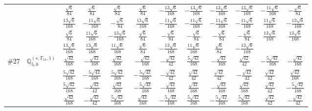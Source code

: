 \documentclass[fleqn,9pt,landscape]{jsarticle}
\begin{document}
\begin{center}
\begin{longtable}{lcccccccccc}
& $ \frac{\sqrt{6}}{84} $ & $ \frac{\sqrt{6}}{84} $ & $ \frac{\sqrt{6}}{84} $ & $ \frac{\sqrt{6}}{84} $ & $ - \frac{13 \sqrt{6}}{168} $ & $ - \frac{13 \sqrt{6}}{168} $ & $ - \frac{13 \sqrt{6}}{168} $ & $ - \frac{13 \sqrt{6}}{168} $ & $ - \frac{11 \sqrt{6}}{168} $ & $ - \frac{\sqrt{6}}{84} $ \\
& $ \frac{13 \sqrt{6}}{168} $ & $ - \frac{11 \sqrt{6}}{168} $ & $ - \frac{\sqrt{6}}{84} $ & $ \frac{13 \sqrt{6}}{168} $ & $ - \frac{11 \sqrt{6}}{168} $ & $ - \frac{11 \sqrt{6}}{168} $ & $ - \frac{11 \sqrt{6}}{168} $ & $ - \frac{11 \sqrt{6}}{168} $ & $ \frac{11 \sqrt{6}}{168} $ & $ - \frac{13 \sqrt{6}}{168} $ \\
& $ \frac{\sqrt{6}}{84} $ & $ \frac{11 \sqrt{6}}{168} $ & $ - \frac{13 \sqrt{6}}{168} $ & $ \frac{\sqrt{6}}{84} $ & $ - \frac{\sqrt{6}}{84} $ & $ - \frac{\sqrt{6}}{84} $ & $ - \frac{\sqrt{6}}{84} $ & $ - \frac{\sqrt{6}}{84} $ & $ \frac{13 \sqrt{6}}{168} $ & $ \frac{13 \sqrt{6}}{168} $ \\
& $ \frac{13 \sqrt{6}}{168} $ & $ \frac{13 \sqrt{6}}{168} $ & $ \frac{11 \sqrt{6}}{168} $ & $ \frac{\sqrt{6}}{84} $ & $ - \frac{13 \sqrt{6}}{168} $ & $ \frac{11 \sqrt{6}}{168} $ & $ \frac{\sqrt{6}}{84} $ & $ - \frac{13 \sqrt{6}}{168} $ & $  $ & $  $ \\ \hline
$ \#27\quad \mathbb{Q}_{5,0}^{(s,T_{1u},1)} $ & $ \frac{\sqrt{42}}{168} $ & $ - \frac{\sqrt{42}}{168} $ & $ \frac{\sqrt{42}}{168} $ & $ - \frac{\sqrt{42}}{168} $ & $ - \frac{\sqrt{42}}{42} $ & $ \frac{5 \sqrt{42}}{168} $ & $ - \frac{\sqrt{42}}{168} $ & $ \frac{\sqrt{42}}{42} $ & $ - \frac{5 \sqrt{42}}{168} $ & $ - \frac{\sqrt{42}}{168} $ \\
& $ \frac{5 \sqrt{42}}{168} $ & $ - \frac{5 \sqrt{42}}{168} $ & $ \frac{5 \sqrt{42}}{168} $ & $ - \frac{5 \sqrt{42}}{168} $ & $ - \frac{\sqrt{42}}{42} $ & $ \frac{\sqrt{42}}{42} $ & $ \frac{\sqrt{42}}{42} $ & $ - \frac{\sqrt{42}}{42} $ & $ \frac{\sqrt{42}}{42} $ & $ \frac{\sqrt{42}}{168} $ \\
& $ \frac{5 \sqrt{42}}{168} $ & $ - \frac{\sqrt{42}}{42} $ & $ \frac{\sqrt{42}}{168} $ & $ - \frac{5 \sqrt{42}}{168} $ & $ - \frac{\sqrt{42}}{168} $ & $ \frac{\sqrt{42}}{168} $ & $ - \frac{\sqrt{42}}{168} $ & $ \frac{\sqrt{42}}{168} $ & $ \frac{\sqrt{42}}{42} $ & $ - \frac{5 \sqrt{42}}{168} $ \\
& $ \frac{\sqrt{42}}{168} $ & $ - \frac{\sqrt{42}}{42} $ & $ \frac{5 \sqrt{42}}{168} $ & $ \frac{\sqrt{42}}{168} $ & $ - \frac{5 \sqrt{42}}{168} $ & $ \frac{5 \sqrt{42}}{168} $ & $ - \frac{5 \sqrt{42}}{168} $ & $ \frac{5 \sqrt{42}}{168} $ & $ \frac{\sqrt{42}}{42} $ & $ - \frac{\sqrt{42}}{42} $ \\

\end{longtable}
\end{center}
\end{document}
